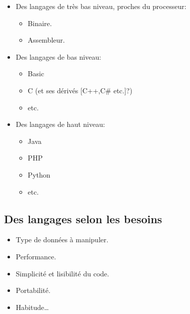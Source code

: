 \begin{slide}
	\begin{itemize}
		\item Des langages de très bas niveau, proches du processeur:
		\begin{itemize}
			\item Binaire.
			\item Assembleur.
		
		\end{itemize}
		\item Des langages de bas niveau:		
		\begin{itemize}
			\item Basic
			\item C (et ses dérivés [C++,C\# etc.]?)
			\item etc.
			\relax
		\end{itemize}
		
		\item Des langages de haut niveau:			
		\begin{itemize}
			\item Java
			\item PHP
			\item Python
			\item etc.
			
		\end{itemize}
			
	\end{itemize}
\end{slide}


\subsection{Des langages selon les besoins}
\begin{slide}
	\begin{itemize}
		\item Type de données à manipuler.
		\item Performance.
		\item Simplicité et lisibilité du code.
		\item Portabilité.
		\item Habitude… 
	\end{itemize}
\end{slide}






